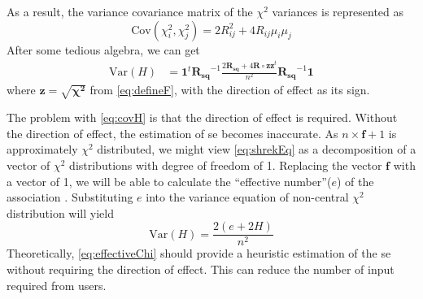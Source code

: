 			As a result, the variance covariance matrix of the $\chi^2$ variances is represented as
			\begin{equation}
				\mathrm{Cov}(\chi_i^2,\chi_j^2) = 2R_{ij}^2+4R_{ij}\mu_i\mu_j
				\label{eq:finalChi}
			\end{equation}
			After some tedious algebra, we can get 
			\begin{align}
				\mathrm{Var}(H) &=\boldsymbol{1}^t\boldsymbol{R_{sq}}^{-1}\frac{2\boldsymbol{R_{sq}}+4\boldsymbol{R}\circ \boldsymbol{zz}^t}{n^2}\boldsymbol{R_{sq}}^{-1}\boldsymbol{1}
				\label{eq:covH}
			\end{align}
			where $\boldsymbol{z} = \sqrt{\boldsymbol{\chi^2}}$ from \cref{eq:defineF}, with the direction of effect as its sign.
			 
			The problem with \cref{eq:covH} is that the direction of effect is required. 
			Without the direction of effect, the estimation of \gls{se} becomes inaccurate. 
			As $n\times \boldsymbol{f}+1$ is approximately $\chi^2$ distributed, we might view \cref{eq:shrekEq} as a decomposition of a vector of $\chi^2$ distributions with degree of freedom of 1. 
			Replacing the vector $\boldsymbol{f}$ with a vector of 1, we will be able to calculate the ``effective number''($e$) of the association \citep{Li2011}. 
			Substituting $e$ into the variance equation of non-central $\chi^2$ distribution will yield
			\begin{equation}
			\mathrm{Var}(H) = \frac{2(e+2H)}{n^2}
			\label{eq:effectiveChi}
			\end{equation}
			Theoretically, \cref{eq:effectiveChi} should provide a heuristic estimation of the \gls{se} without requiring the direction of effect.
			This can reduce the number of input required from users.
			

